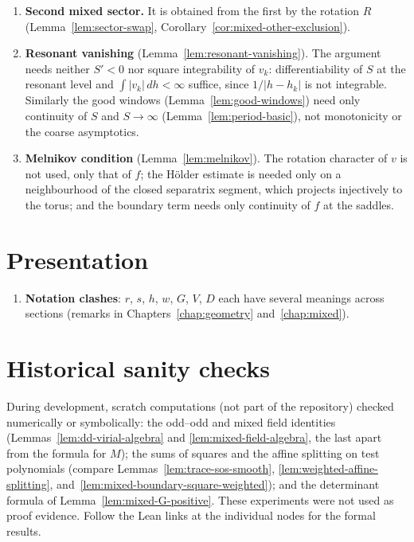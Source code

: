 \begin{enumerate}
        are $C^1$ even at the center (Lemma~\ref{lem:dd-ground-c1}). Bounded
        multiplication proves the weighted quotient domain without Picone
        energy, matrix coercivity or point removal
        (Lemma~\ref{lem:dd-bulk-form-domain}); this is checked in Lean.
  \item \textbf{Second mixed sector.} It is obtained from the first by the
        rotation $R$ (Lemma~\ref{lem:sector-swap},
        Corollary~\ref{cor:mixed-other-exclusion}).
  \item \textbf{Resonant vanishing} (Lemma~\ref{lem:resonant-vanishing}). The argument
        needs neither $S'<0$ nor square integrability of $v_k$: differentiability of
        $S$ at the resonant level and $\int|v_k|\,dh<\infty$ suffice, since
        $1/|h-h_k|$ is not integrable. Similarly the good windows
        (Lemma~\ref{lem:good-windows}) need only continuity of $S$ and $S\to\infty$
        (Lemma~\ref{lem:period-basic}), not monotonicity or the coarse asymptotics.
  \item \textbf{Melnikov condition} (Lemma~\ref{lem:melnikov}). The rotation character of
        $v$ is not used, only that of $f$; the H\"older estimate is needed only on a
        neighbourhood of the closed separatrix segment, which projects injectively to the
        torus; and the boundary term needs only continuity of $f$ at the saddles.
\end{enumerate}

\section*{Presentation}
\begin{enumerate}
  \item \textbf{Notation clashes}: $r$, $s$, $h$, $w$, $G$, $V$, $D$ each have
        several meanings across sections (remarks in
        Chapters~\ref{chap:geometry} and~\ref{chap:mixed}).
\end{enumerate}

\section*{Historical sanity checks}
During development, scratch computations (not part of the repository)
checked numerically or symbolically:
the odd--odd and mixed field identities
(Lemmas~\ref{lem:dd-virial-algebra} and \ref{lem:mixed-field-algebra}, the
last apart from the formula for $M$);
the sums of squares and the affine splitting
on test polynomials (compare Lemmas~\ref{lem:trace-sos-smooth},
\ref{lem:weighted-affine-splitting}, and~\ref{lem:mixed-boundary-square-weighted});
and the determinant formula of Lemma~\ref{lem:mixed-G-positive}.
These experiments were not used as proof evidence. Follow the Lean links
at the individual nodes for the formal results.
